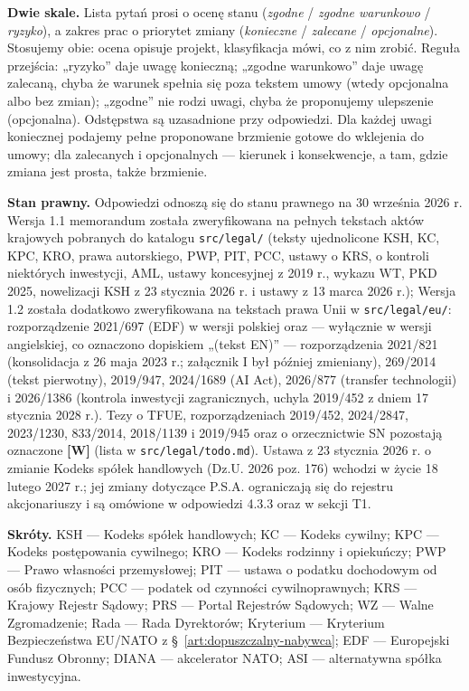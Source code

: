 \documentclass[12pt,a4paper]{report}
\newcommand{\KSH}{Kodeks spółek handlowych}
\newcommand{\Wiar}[1]{\textbf{[#1]}}
\begin{document}
\textbf{Dwie skale.} Lista pytań prosi o ocenę stanu (\emph{zgodne} / \emph{zgodne warunkowo} / \emph{ryzyko}), a zakres prac o priorytet zmiany (\emph{konieczne} / \emph{zalecane} / \emph{opcjonalne}). Stosujemy obie: ocena opisuje projekt, klasyfikacja mówi, co z nim zrobić. Reguła przejścia: „ryzyko” daje uwagę konieczną; „zgodne warunkowo” daje uwagę zalecaną, chyba że warunek spełnia się poza tekstem umowy (wtedy opcjonalna albo bez zmian); „zgodne” nie rodzi uwagi, chyba że proponujemy ulepszenie (opcjonalna). Odstępstwa są uzasadnione przy odpowiedzi. Dla każdej uwagi koniecznej podajemy pełne proponowane brzmienie gotowe do wklejenia do umowy; dla zalecanych i opcjonalnych --- kierunek i konsekwencje, a tam, gdzie zmiana jest prosta, także brzmienie.

\textbf{Stan prawny.} Odpowiedzi odnoszą się do stanu prawnego na 30 września 2026 r. Wersja 1.1 memorandum została zweryfikowana na pełnych tekstach aktów krajowych pobranych do katalogu \texttt{src/legal/} (teksty ujednolicone KSH, KC, KPC, KRO, prawa autorskiego, PWP, PIT, PCC, ustawy o KRS, o kontroli niektórych inwestycji, AML, ustawy koncesyjnej z 2019 r., wykazu WT, PKD 2025, nowelizacji KSH z 23 stycznia 2026 r. i ustawy z 13 marca 2026 r.); Wersja 1.2 została dodatkowo zweryfikowana na tekstach prawa Unii w \texttt{src/legal/eu/}: rozporządzenie 2021/697 (EDF) w wersji polskiej oraz --- wyłącznie w wersji angielskiej, co oznaczono dopiskiem „(tekst EN)” --- rozporządzenia 2021/821 (konsolidacja z 26 maja 2023 r.; załącznik I był później zmieniany), 269/2014 (tekst pierwotny), 2019/947, 2024/1689 (AI Act), 2026/877 (transfer technologii) i 2026/1386 (kontrola inwestycji zagranicznych, uchyla 2019/452 z dniem 17 stycznia 2028 r.). Tezy o TFUE, rozporządzeniach 2019/452, 2024/2847, 2023/1230, 833/2014, 2018/1139 i 2019/945 oraz o orzecznictwie SN pozostają oznaczone \Wiar{W} (lista w \texttt{src/legal/todo.md}). Ustawa z 23 stycznia 2026 r. o zmianie \KSH{} (Dz.U. 2026 poz. 176) wchodzi w życie 18 lutego 2027 r.; jej zmiany dotyczące P.S.A. ograniczają się do rejestru akcjonariuszy i są omówione w odpowiedzi 4.3.3 oraz w sekcji T1.


\textbf{Skróty.} KSH --- Kodeks spółek handlowych; KC --- Kodeks cywilny; KPC --- Kodeks postępowania cywilnego; KRO --- Kodeks rodzinny i opiekuńczy; PWP --- Prawo własności przemysłowej; PIT --- ustawa o podatku dochodowym od osób fizycznych; PCC --- podatek od czynności cywilnoprawnych; KRS --- Krajowy Rejestr Sądowy; PRS --- Portal Rejestrów Sądowych; WZ --- Walne Zgromadzenie; Rada --- Rada Dyrektorów; Kryterium --- Kryterium Bezpieczeństwa EU/NATO z §~\ref{art:dopuszczalny-nabywca}; EDF --- Europejski Fundusz Obronny; DIANA --- akcelerator NATO; ASI --- alternatywna spółka inwestycyjna.
\end{document}
